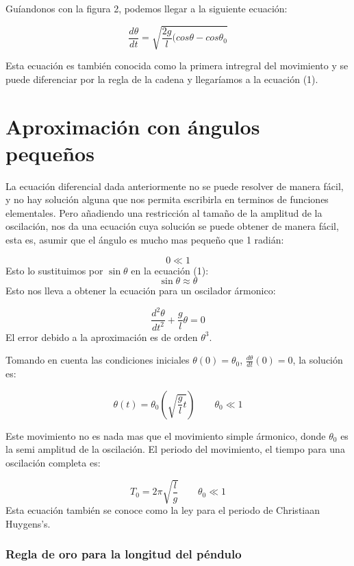 \documentclass[12pt,letterpaper]{article}
\begin{document}
Guíandonos con la figura 2, podemos llegar a la siguiente ecuación:

\begin{equation}
\frac{d\theta}{dt} = \sqrt{\frac{2g}{l}(cos\theta - cos\theta_0}
\end{equation}

Esta ecuación es también conocida como la primera intregral del movimiento y se puede diferenciar por la regla de la cadena y llegaríamos a la ecuación (1). 



\section{Aproximación con ángulos pequeños}

La ecuación diferencial dada anteriormente no se puede resolver de manera fácil, y no hay solución alguna que nos permita escribirla en terminos de funciones elementales. Pero añadiendo una restricción al tamaño de la amplitud de la oscilación, nos da una ecuación cuya solución se puede obtener de manera fácil, esta es, asumir que el ángulo es mucho mas pequeño que 1 radián:

 $$0 \ll 1$$
Esto lo sustituimos por $\sin\theta$ en la ecuación (1): $$ \sin\theta \approx \theta $$
Esto nos lleva a obtener la ecuación para un oscilador ármonico:

$$ \frac{d^2\theta}{dt^2} + \frac{g}{l}\theta = 0 $$
El error debido a la aproximación es de orden $\theta^3$.

Tomando en cuenta las condiciones iniciales $ \theta(0) = \theta_0 $, $\frac{d\theta}{dt}(0) = 0 $, la solución es: 

\begin{equation}
\nonumber \theta(t)= \theta_0 (\sqrt{\frac{g}{l}t})  \qquad \theta_0 \ll 1
\end{equation}

Este movimiento no es nada mas que el movimiento simple ármonico, donde $\theta_0$ es la semi amplitud de la oscilación. El periodo del movimiento, el tiempo para una oscilación completa es:

$$ T_0 = 2\pi \sqrt{\frac{l}{g}} \qquad \theta_0 \ll 1  $$
Esta ecuación también se conoce como la ley para el periodo de Christiaan Huygens's.

\subsubsection{Regla de oro para la longitud del péndulo}
\end{document}
